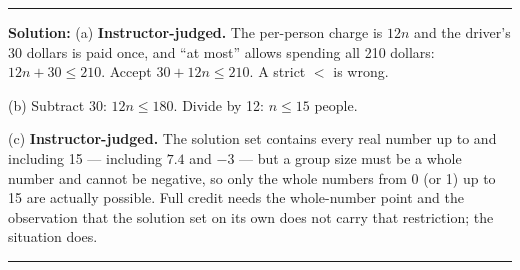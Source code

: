 \documentclass[12pt]{article}
\begin{document}
\vspace{0.25cm}\noindent\rule{\linewidth}{0.2pt}\vspace{0.25cm}


\textbf{Solution:} (a) \textbf{Instructor-judged.} The per-person charge is
$12n$ and the driver's 30 dollars is paid once, and ``at most'' allows spending
all 210 dollars: $12n + 30 \le 210$. Accept $30 + 12n \le 210$. A strict $<$ is
wrong.

(b) Subtract 30: $12n \le 180$. Divide by 12:
$n \le 15$ people. 

(c) \textbf{Instructor-judged.} The solution set contains every real number up
to and including 15 --- including $7.4$ and $-3$ --- but a group size must be a
whole number and cannot be negative, so only the whole numbers from 0 (or 1) up
to 15 are actually possible. Full credit needs the whole-number point and the
observation that the solution set on its own does not carry that restriction;
the situation does.

\vspace{0.25cm}\noindent\rule{\linewidth}{0.2pt}\vspace{0.25cm}
\end{document}

